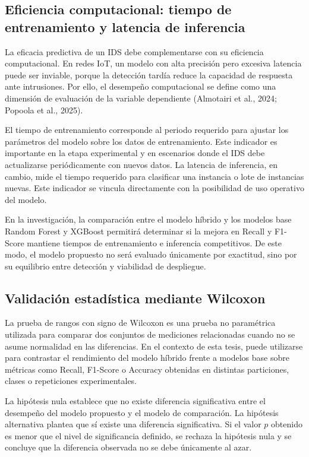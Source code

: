 \documentclass[12pt,a4paper]{article}
\begin{document}
\subsection{Eficiencia computacional: tiempo de entrenamiento y latencia de inferencia}

La eficacia predictiva de un IDS debe complementarse con su eficiencia computacional. En redes IoT, un modelo con alta precisión pero excesiva latencia puede ser inviable, porque la detección tardía reduce la capacidad de respuesta ante intrusiones. Por ello, el desempeño computacional se define como una dimensión de evaluación de la variable dependiente (Almotairi et al., 2024; Popoola et al., 2025).

El tiempo de entrenamiento corresponde al periodo requerido para ajustar los parámetros del modelo sobre los datos de entrenamiento. Este indicador es importante en la etapa experimental y en escenarios donde el IDS debe actualizarse periódicamente con nuevos datos. La latencia de inferencia, en cambio, mide el tiempo requerido para clasificar una instancia o lote de instancias nuevas. Este indicador se vincula directamente con la posibilidad de uso operativo del modelo.

En la investigación, la comparación entre el modelo híbrido y los modelos base Random Forest y XGBoost permitirá determinar si la mejora en Recall y F1-Score mantiene tiempos de entrenamiento e inferencia competitivos. De este modo, el modelo propuesto no será evaluado únicamente por exactitud, sino por su equilibrio entre detección y viabilidad de despliegue.

\subsection{Validación estadística mediante Wilcoxon}

La prueba de rangos con signo de Wilcoxon es una prueba no paramétrica utilizada para comparar dos conjuntos de mediciones relacionadas cuando no se asume normalidad en las diferencias. En el contexto de esta tesis, puede utilizarse para contrastar el rendimiento del modelo híbrido frente a modelos base sobre métricas como Recall, F1-Score o Accuracy obtenidas en distintas particiones, clases o repeticiones experimentales.

La hipótesis nula establece que no existe diferencia significativa entre el desempeño del modelo propuesto y el modelo de comparación. La hipótesis alternativa plantea que sí existe una diferencia significativa. Si el valor $p$ obtenido es menor que el nivel de significancia definido, se rechaza la hipótesis nula y se concluye que la diferencia observada no se debe únicamente al azar.
\end{document}
